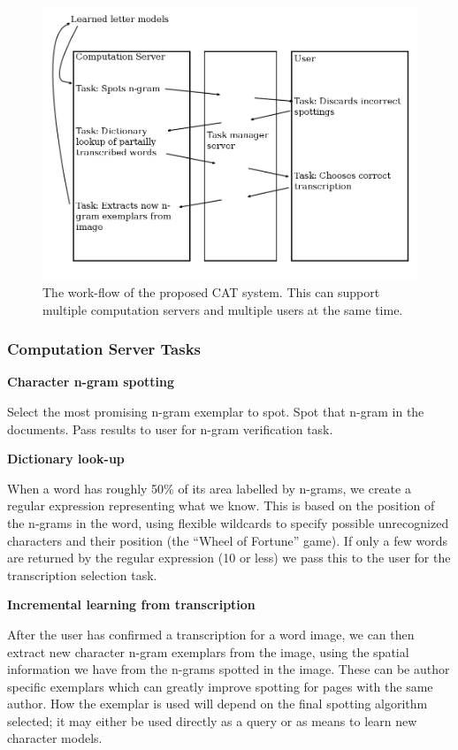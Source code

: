 \documentclass[ms]{byuprop}
\begin{document}
\begin{figure}[h]
    \centering
    \includegraphics[width=.85\textwidth]{system_diagram_with_arrows}
    \caption{The work-flow of the proposed CAT system. This can support multiple computation servers and multiple users at the same time.}
    \label{fig:system_diagram}
\end{figure}


\subsubsection{Computation Server Tasks}

{\setlength{\parindent}{0cm}
\textbf{Character n-gram spotting}

\begin{addmargin}[3em]{3em}
Select the most promising n-gram exemplar to spot. Spot that n-gram in the documents. Pass results to user for n-gram verification task.
\\[.5cm]
\end{addmargin}


\textbf{Dictionary look-up}

\begin{addmargin}[3em]{3em}
When a word has roughly 50\% of its area labelled by n-grams, we create a regular expression representing what we know. This is based on the position of the n-grams in the word, using flexible wildcards to specify possible unrecognized characters and their position (the ``Wheel of Fortune'' game). If only a few words are returned by the regular expression (10 or less) we pass this to the user for the transcription selection task.
\\[.5cm]
\end{addmargin}

\textbf{Incremental learning from transcription}

\begin{addmargin}[3em]{3em}
After the user has confirmed a transcription for a word image, we can then extract new character n-gram exemplars from the image, using the spatial information we have from the n-grams spotted in the image. These can be author specific exemplars which can greatly improve spotting for pages with the same author. How the exemplar is used will depend on the final spotting algorithm selected; it may either be used directly as a query or as means to learn new character models.
\\[.5cm]
\end{addmargin}
}
\end{document}
